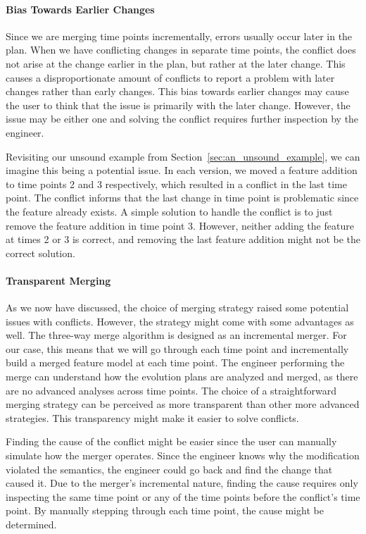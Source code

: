 \documentclass[a4paper,english]{ifimaster}
\begin{document}
\paragraph{Bias Towards Earlier Changes}%
\label{par:bias_towards_earlier_time_points}

Since we are merging time points incrementally, errors usually occur later in the plan. When we have conflicting changes in separate time points, the conflict does not arise at the change earlier in the plan, but rather at the later change. This causes a disproportionate amount of conflicts to report a problem with later changes rather than early changes. This bias towards earlier changes may cause the user to think that the issue is primarily with the later change. However, the issue may be either one and solving the conflict requires further inspection by the engineer.

Revisiting our unsound example from Section~\vref{sec:an_unsound_example}, we can imagine this being a potential issue. In each version, we moved a feature addition to time points 2 and 3 respectively, which resulted in a conflict in the last time point. The conflict informs that the last change in time point is problematic since the feature already exists. A simple solution to handle the conflict is to just remove the feature addition in time point 3. However, neither adding the feature at times 2 or 3 is correct, and removing the last feature addition might not be the correct solution.

\paragraph{Transparent Merging}%
\label{par:transparent_merging}

As we now have discussed, the choice of merging strategy raised some potential issues with conflicts. However, the strategy might come with some advantages as well. The three-way merge algorithm is designed as an incremental merger. For our case, this means that we will go through each time point and incrementally build a merged feature model at each time point. The engineer performing the merge can understand how the evolution plans are analyzed and merged, as there are no advanced analyses across time points. The choice of a straightforward merging strategy can be perceived as more transparent than other more advanced strategies. This transparency might make it easier to solve conflicts.

Finding the cause of the conflict might be easier since the user can manually simulate how the merger operates. Since the engineer knows why the modification violated the semantics, the engineer could go back and find the change that caused it. Due to the merger's incremental nature, finding the cause requires only inspecting the same time point or any of the time points before the conflict's time point. By manually stepping through each time point, the cause might be determined.
\end{document}
